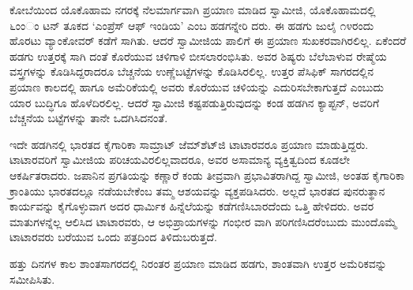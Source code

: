 ಕೋಬೆಯಿಂದ ಯೊಕೊಹಾಮ ನಗರಕ್ಕೆ ನೆಲಮಾರ್ಗವಾಗಿ ಪ್ರಯಾಣ ಮಾಡಿದ ಸ್ವಾಮೀಜಿ, ಯೊಕೊಹಾಮದಲ್ಲಿ ೬ಂಂಂ ಟನ್ ತೂಕದ ‘ಎಂಪ್ರೆಸ್ ಆಫ್ ಇಂಡಿಯ’ ಎಂಬ ಹಡಗನ್ನೇರಿ ದರು. ಈ ಹಡಗು ಜುಲೈ ೧೪ರಂದು ಹೊರಟು ವ್ಯಾಂಕೋವರ್ ಕಡೆಗೆ ಸಾಗಿತು. ಆದರೆ ಸ್ವಾಮೀಜಿಯ ಪಾಲಿಗೆ ಈ ಪ್ರಯಾಣ ಸುಖಕರವಾಗಿರಲಿಲ್ಲ. ಏಕೆಂದರೆ ಹಡಗು ಉತ್ತರಕ್ಕೆ ಸಾಗಿ ದಂತೆ ಕೊರೆಯುವ ಚಳಿಗಾಳಿ ಬೀಸಲಾರಂಭಿಸಿತು. ಅವರ ಶಿಷ್ಯರು ಬೆಲೆಬಾಳುವ ರೇಷ್ಮೆಯ ವಸ್ತ್ರಗಳನ್ನು ಕೊಡಿಸಿದ್ದರಾದರೂ ಬೆಚ್ಚನೆಯ ಉಣ್ಣೆಬಟ್ಟೆಗಳನ್ನು ಕೊಡಿಸಿರಲಿಲ್ಲ. ಉತ್ತರ ಪೆಸಿಫಿಕ್ ಸಾಗರದಲ್ಲಿನ ಪ್ರಯಾಣ ಕಾಲದಲ್ಲಿ ಹಾಗೂ ಅಮೆರಿಕೆಯಲ್ಲಿ ಅವರು ಕೊರೆಯುವ ಚಳಿಯನ್ನು ಎದುರಿಸಬೇಕಾಗುತ್ತದೆ ಎಂಬುದು ಯಾರ ಬುದ್ಧಿಗೂ ಹೊಳೆದಿರಲಿಲ್ಲ. ಆದರೆ ಸ್ವಾಮೀಜಿ ಕಷ್ಟಪಡುತ್ತಿರುವುದನ್ನು ಕಂಡ ಹಡಗಿನ ಕ್ಯಾಪ್ಟನ್, ಅವರಿಗೆ ಬೆಚ್ಚನೆಯ ಬಟ್ಟೆಗಳನ್ನು ತಾನೇ ಒದಗಿಸಿದನಂತೆ.

ಇದೇ ಹಡಗಿನಲ್ಲಿ ಭಾರತದ ಕೈಗಾರಿಕಾ ಸಾಮ್ರಾಟ್ ಜೆಮ್​ಶೆಟ್​ಜಿ ಟಾಟಾರವರೂ ಪ್ರಯಾಣ ಮಾಡುತ್ತಿದ್ದರು. ಟಾಟಾರವರಿಗೆ ಸ್ವಾಮೀಜಿಯ ಪರಿಚಯವಿರಲಿಲ್ಲವಾದರೂ, ಅವರ ಅಸಾಮಾನ್ಯ ವ್ಯಕ್ತಿತ್ವದಿಂದ ಕೂಡಲೇ ಆಕರ್ಷಿತರಾದರು. ಜಪಾನಿನ ಪ್ರಗತಿಯನ್ನು ಕಣ್ಣಾರೆ ಕಂಡು ತೀವ್ರವಾಗಿ ಪ್ರಭಾವಿತರಾಗಿದ್ದ ಸ್ವಾಮೀಜಿ, ಅಂತಹ ಕೈಗಾರಿಕಾ ಕ್ರಾಂತಿಯು ಭಾರತದಲ್ಲೂ ನಡೆಯಬೇಕೆಂಬ ತಮ್ಮ ಆಶಯವನ್ನು ವ್ಯಕ್ತಪಡಿಸಿದರು. ಅಲ್ಲದೆ ಭಾರತದ ಪುನರುತ್ಥಾನ ಕಾರ್ಯವನ್ನು ಕೈಗೊಳ್ಳುವಾಗ ಅದರ ಧಾರ್ಮಿಕ ಹಿನ್ನೆಲೆಯನ್ನು ಕಡೆಗಣಿಸಿಬಾರದೆಂದು ಒತ್ತಿ ಹೇಳಿದರು. ಅವರ ಮಾತುಗಳನ್ನೆಲ್ಲ ಆಲಿಸಿದ ಟಾಟಾರವರು, ಆ ಅಭಿಪ್ರಾಯಗಳನ್ನು ಗಂಭೀರ ವಾಗಿ ಪರಿಗಣಿಸಿದರೆಂಬುದು ಮುಂದೊಮ್ಮೆ ಟಾಟಾರವರು ಬರೆಯುವ ಒಂದು ಪತ್ರದಿಂದ ತಿಳಿದುಬರುತ್ತದೆ.

ಹತ್ತು ದಿನಗಳ ಕಾಲ ಶಾಂತಸಾಗರದಲ್ಲಿ ನಿರಂತರ ಪ್ರಯಾಣ ಮಾಡಿದ ಹಡಗು, ಶಾಂತವಾಗಿ ಉತ್ತರ ಅಮೆರಿಕವನ್ನು ಸಮೀಪಿಸಿತು.

